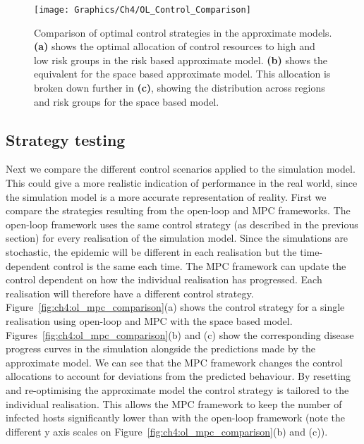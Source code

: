 \begin{figure}[h]
    \begin{center}
        \texttt{[image: Graphics/Ch4/OL\_Control\_Comparison]}
        \caption[Optimised time-dependent control strategies]{Comparison of optimal control strategies in the approximate models. \textbf{(a)} shows the optimal allocation of control resources to high and low risk groups in the risk based approximate model. \textbf{(b)} shows the equivalent for the space based approximate model. This allocation is broken down further in \textbf{(c)}, showing the distribution across regions and risk groups for the space based model.}
        \label{fig:ch4:opt_control_comparison}
    \end{center}
\end{figure}

\subsection{Strategy testing}

Next we compare the different control scenarios applied to the simulation model. This could give a more realistic indication of performance in the real world, since the simulation model is a more accurate representation of reality. First we compare the strategies resulting from the open-loop and MPC frameworks. The open-loop framework uses the same control strategy (as described in the previous section) for every realisation of the simulation model. Since the simulations are stochastic, the epidemic will be different in each realisation but the time-dependent control is the same each time. The MPC framework can update the control dependent on how the individual realisation has progressed. Each realisation will therefore have a different control strategy. Figure~\ref{fig:ch4:ol_mpc_comparison}(a) shows the control strategy for a single realisation using open-loop and MPC with the space based model. Figures~\ref{fig:ch4:ol_mpc_comparison}(b) and (c) show the corresponding disease progress curves in the simulation alongside the predictions made by the approximate model. We can see that the MPC framework changes the control allocations to account for deviations from the predicted behaviour. By resetting and re-optimising the approximate model the control strategy is tailored to the individual realisation. This allows the MPC framework to keep the number of infected hosts significantly lower than with the open-loop framework (note the different y axis scales on Figure~\ref{fig:ch4:ol_mpc_comparison}(b) and (c)).

